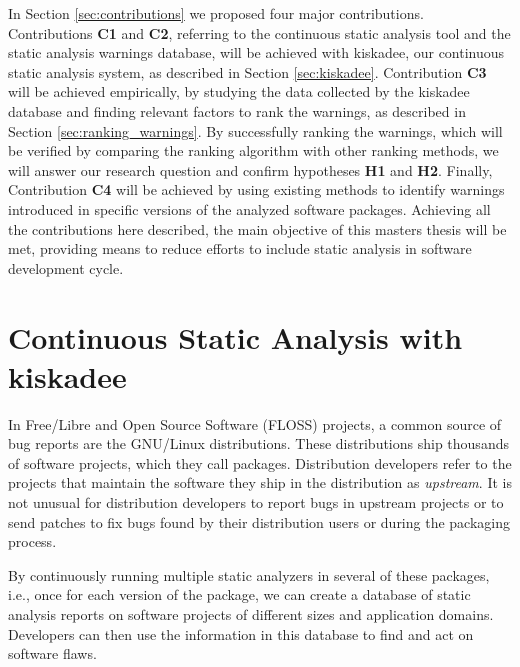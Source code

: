 In Section \ref{sec:contributions} we proposed four major contributions.
Contributions \textbf{C1} and \textbf{C2}, referring to the continuous static
analysis tool and the static analysis warnings database, will be achieved with
kiskadee, our continuous static analysis system, as described in Section
\ref{sec:kiskadee}. Contribution \textbf{C3} will be achieved empirically, by
studying the data collected by the kiskadee database and finding relevant
factors to rank the warnings, as described in Section
\ref{sec:ranking_warnings}. By successfully ranking the warnings, which will be
verified by comparing the ranking algorithm with other ranking methods, we will
answer our research question and confirm hypotheses \textbf{H1} and
\textbf{H2}. Finally, Contribution \textbf{C4} will be achieved by using
existing methods to identify warnings introduced in specific versions of the
analyzed software packages. Achieving all the contributions here described, the
main objective of this masters thesis will be met, providing means to reduce
efforts to include static analysis in software development cycle.


\section{Continuous Static Analysis with kiskadee}
\label{sec:continuous_static_analysis}

In Free/Libre and Open Source Software (FLOSS) projects, a common source of bug reports are the GNU/Linux
distributions. These distributions ship thousands of software projects, which
they call packages. Distribution developers refer to the projects that maintain
the software they ship in the distribution as \textit{upstream}.  It is not
unusual for distribution developers to report bugs in upstream projects or to
send patches to fix bugs found by their distribution users or during the
packaging process.

By continuously running multiple static analyzers in several of these packages,
i.e., once for each version of the package, we can create a database of static
analysis reports on software projects of different sizes and application
domains. Developers can then use the information in this database to find and
act on software flaws.

